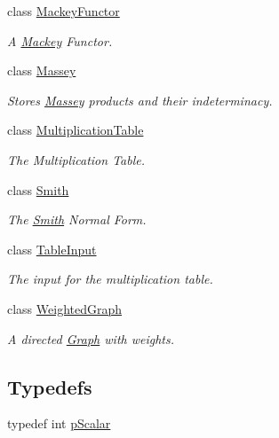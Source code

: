 \begin{DoxyCompactItemize}
class \hyperlink{classMackey_1_1MackeyFunctor}{Mackey\+Functor}
\begin{DoxyCompactList}\small\item\em A \hyperlink{namespaceMackey}{Mackey} Functor. \end{DoxyCompactList}\item 
class \hyperlink{classMackey_1_1Massey}{Massey}
\begin{DoxyCompactList}\small\item\em Stores \hyperlink{classMackey_1_1Massey}{Massey} products and their indeterminacy. \end{DoxyCompactList}\item 
class \hyperlink{classMackey_1_1MultiplicationTable}{Multiplication\+Table}
\begin{DoxyCompactList}\small\item\em The Multiplication Table. \end{DoxyCompactList}\item 
class \hyperlink{classMackey_1_1Smith}{Smith}
\begin{DoxyCompactList}\small\item\em The \hyperlink{classMackey_1_1Smith}{Smith} Normal Form. \end{DoxyCompactList}\item 
class \hyperlink{classMackey_1_1TableInput}{Table\+Input}
\begin{DoxyCompactList}\small\item\em The input for the multiplication table. \end{DoxyCompactList}\item 
class \hyperlink{classMackey_1_1WeightedGraph}{Weighted\+Graph}
\begin{DoxyCompactList}\small\item\em A directed \hyperlink{classMackey_1_1Graph}{Graph} with weights. \end{DoxyCompactList}\end{DoxyCompactItemize}
\subsection*{Typedefs}
\begin{DoxyCompactItemize}
\item 
typedef int \hyperlink{namespaceMackey_a4f147e328c520f568f5d3adf1c75f514}{p\+Scalar}
\end{DoxyCompactItemize}
